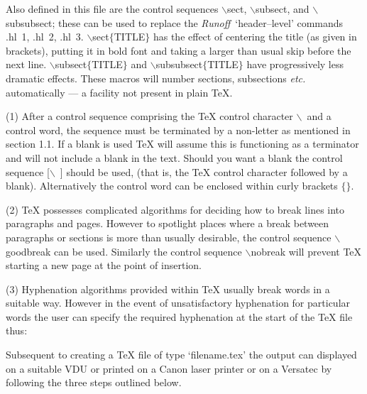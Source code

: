 Also defined in this file are the control sequences $\backslash$sect,
$\backslash$subsect, and $\backslash$subsubsect; these can be used to 
replace the {\it Runoff}\ 
`header--level' commands .hl~1, .hl~2, .hl~3.
$\backslash$sect$\{$TITLE$\}$  has 
the effect of centering the
title (as given in brackets), putting it in bold font and taking a larger than
usual skip before the next line.
$\backslash$subsect$\{$TITLE$\}$ and $\backslash$subsubsect$\{$TITLE$\}$ 
have progressively less dramatic effects.
These macros will number sections, subsections {\it etc.} automatically --- 
a facility not present in plain \TeX.


\item{(1)} After a control sequence comprising the {\TeX} control character $\backslash$\ 
and a control word, the sequence must be terminated by
a non-letter as mentioned in section 1.1.
If a blank is used {\TeX} will assume this is functioning as a
terminator and will not include a blank in the text.
Should you want a blank the control sequence [$\backslash$\ ] should
be used, (that is, the {\TeX} control character followed by a blank).
Alternatively the control word can be enclosed within curly brackets $\{ \}$.

\item{(2)} {\TeX} possesses complicated algorithms for deciding how to break
lines into paragraphs and pages.
However to spotlight places where a break between paragraphs or
sections is more than usually desirable, the  control sequence $\backslash$goodbreak
can be used.
Similarly the control sequence $\backslash$nobreak will prevent {\TeX} starting a new
page at the point of insertion.

\item{(3)} Hyphenation algorithms provided within {\TeX} usually break words in
a suitable way.
However in the event of unsatisfactory hyphenation for particular words
the user can specify the required hyphenation at the start of the {\TeX} 
file thus:
\medskip
{}



\vfill\eject


Subsequent to creating a {\TeX} file of type `filename.tex' 
the output can displayed on a suitable VDU or printed on a Canon 
laser printer or
on a Versatec by following the three steps outlined below.


